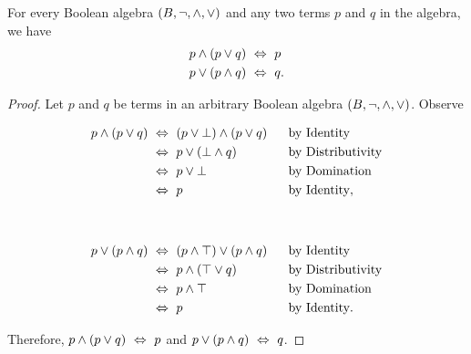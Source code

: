 \begin{theorem}[Absorption]
    For every Boolean algebra $(B, \neg, \wedge, \vee)$ and any two terms $p$ and $q$ in the algebra,
    we have
    \begin{align*}
        p \wedge (p \vee q) &~\Leftrightarrow~ p\\
        p \vee (p \wedge q) &~\Leftrightarrow~ q.
    \end{align*}
\end{theorem}
\begin{proof}
    Let $p$ and $q$ be terms in an arbitrary Boolean algebra $(B, \neg, \wedge, \vee)$.
    Observe
    \begin{center}
        \begin{minipage}{.45\linewidth}
            \begin{alignat*}{2}
                p \wedge (p \vee q) &~\Leftrightarrow~ (p \vee \bot) \wedge (p \vee q)~~&&\text{by Identity}\\
                                    &~\Leftrightarrow~ p \vee (\bot \wedge q) &&\text{by Distributivity}\\
                                    &~\Leftrightarrow~ p \vee \bot &&\text{by Domination}\\
                                    &~\Leftrightarrow~ p &&\text{by Identity},
            \end{alignat*}
        \end{minipage}%
        \begin{minipage}{.1\linewidth}
            ~
        \end{minipage}%
        \begin{minipage}{.45\linewidth}
            \begin{alignat*}{2}
                p \vee (p \wedge q) &~\Leftrightarrow~ (p \wedge \top) \vee (p \wedge q)~~&&\text{by Identity}\\
                                    &~\Leftrightarrow~ p \wedge (\top \vee q) &&\text{by Distributivity}\\
                                    &~\Leftrightarrow~ p \wedge \top &&\text{by Domination}\\
                                    &~\Leftrightarrow~ p &&\text{by Identity}.
            \end{alignat*}
        \end{minipage}
    \end{center}
    Therefore, $p \wedge (p \vee q) ~\Leftrightarrow~ p$ and $p \vee (p \wedge q) ~\Leftrightarrow~ q$.
\end{proof}

